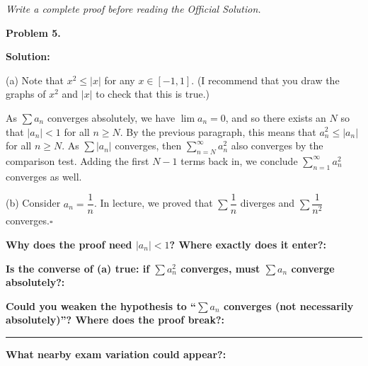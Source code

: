 \documentclass[12pt]{article}
\newcommand{\fillfield}[1]{%
  \par\noindent\textbf{#1:}\enspace\hrulefill\par\vspace{3pt}%
}
\newcommand{\fillfieldlong}[1]{%
  \par\noindent\textbf{#1:}\par\vspace{1.5cm}%
  \noindent\rule{\linewidth}{0.35pt}\par\vspace{4pt}%
}
\newcommand{\writespace}[1]{\vspace{#1}}
\begin{document}
\newpage

\begin{tcolorbox}[
  enhanced, breakable,
  colback  = pass5gray,
  colframe = black!38,
  fonttitle = \bfseries,
  title = {Pass 5 \enspace\textbf{--}\enspace Full Proof Attempt}
]
\small\itshape Write a complete proof before reading the Official Solution.\par
\normalfont\normalsize
\writespace{19cm}
\end{tcolorbox}

\newpage

\begin{tcolorbox}[
  enhanced, breakable,
  colback  = solgreen,
  colframe = green!45!black,
  fonttitle = \bfseries,
  title = {\textsc{Official Solution}\hfill Homework 6 -- Selected Solutions}
]
\textbf{Problem 5.}

\medskip\textbf{Solution:}

\medskip
(a) Note that $x^2 \leq |x|$ for any $x \in [-1,1]$.
(I recommend that you draw the graphs of $x^2$ and $|x|$ to check that this is true.)

As $\sum a_n$ converges absolutely, we have $\lim a_n = 0$, and so there exists an $N$
so that $|a_n| < 1$ for all $n \geq N$.
By the previous paragraph, this means that $a_n^2 \leq |a_n|$ for all $n \geq N$.
As $\sum |a_n|$ converges, then $\sum_{n=N}^{\infty} a_n^2$ also converges by the
comparison test.
Adding the first $N-1$ terms back in, we conclude $\sum_{n=1}^{\infty} a_n^2$
converges as well.

\medskip
(b) Consider $a_n = \dfrac{1}{n}$.
In lecture, we proved that $\sum \dfrac{1}{n}$ diverges and $\sum \dfrac{1}{n^2}$
converges.\hfill$\square$
\end{tcolorbox}

\bigskip

\begin{tcolorbox}[
  enhanced, breakable,
  colback  = reflectcyan,
  colframe = cyan!55!black,
  fonttitle = \bfseries,
  title = {\textsc{Reflection \& Variation}}
]
\fillfield{Why does the proof need $|a_n| < 1$? Where exactly does it enter?}
\fillfield{Is the converse of (a) true: if $\sum a_n^2$ converges, must $\sum a_n$ converge absolutely?}
\fillfieldlong{Could you weaken the hypothesis to ``$\sum a_n$ converges (not necessarily absolutely)''? Where does the proof break?}
\fillfield{What nearby exam variation could appear?}
\end{tcolorbox}

\newpage
\end{document}
